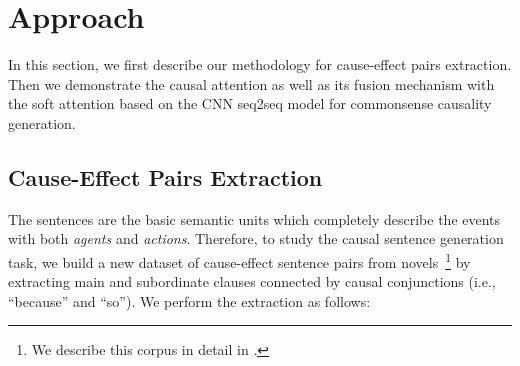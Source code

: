 \section{Approach}
\label{sec:approach}
In this section, we first describe our methodology for 
cause-effect pairs extraction. 
Then we demonstrate the causal attention as well as its fusion mechanism with the soft attention based on the CNN seq2seq model for commonsense causality generation.

\subsection{Cause-Effect Pairs Extraction}
\label{sec:causal_pairs}
The sentences are the basic semantic units which completely describe the events with both \emph{agents} and \emph{actions}.
Therefore, to study the causal sentence generation task, we build a new dataset of cause-effect sentence pairs from novels~\footnote{We describe this corpus in detail in .} by extracting main and subordinate clauses connected by causal conjunctions (i.e., ``because'' and ``so''). 
We perform the extraction as follows:

